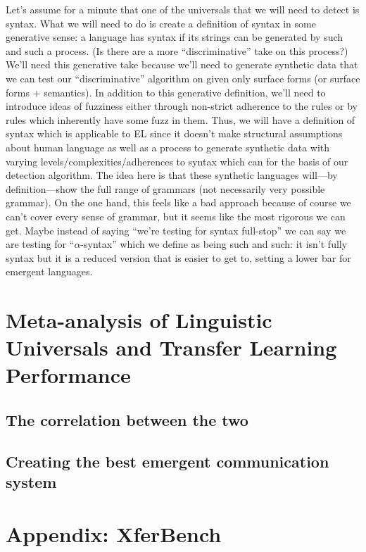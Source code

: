 Let's assume for a minute that one of the universals that we will need to detect is syntax.
What we will need to do is create a definition of syntax in some generative sense: a language has syntax if its strings can be generated by such and such a process.
(Is there are a more ``discriminative'' take on this process?)
We'll need this generative take because we'll need to generate synthetic data that we can test our ``discriminative'' algorithm on given only surface forms (or surface forms + semantics).
In addition to this generative definition, we'll need to introduce ideas of fuzziness either through non-strict adherence to the rules or by rules which inherently have some fuzz in them.
Thus, we will have a definition of syntax which is applicable to EL since it doesn't make structural assumptions about human language as well as a process to generate synthetic data with varying levels/complexities/adherences to syntax which can for the basis of our detection algorithm.
The idea here is that these synthetic languages will---by definition---show the full range of grammars (not necessarily very possible grammar).
On the one hand, this feels like a bad approach because of course we can't cover every sense of grammar, but it seems like the most rigorous we can get.
Maybe instead of saying ``we're testing for syntax full-stop'' we can say we are testing for ``$\alpha$-syntax'' which we define as being such and such: it isn't fully syntax but it is a reduced version that is easier to get to, setting a lower bar for emergent languages.



\chapter{Meta-analysis of Linguistic Universals and Transfer Learning Performance }
\unskip\label{ch:meta-analysis}

\section{The correlation between the two}

\section{Creating the best emergent communication system}




% 

\appendix

\chapter{Appendix: XferBench}



